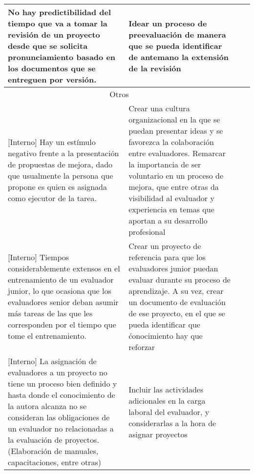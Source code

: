 \documentclass{article}
\begin{document}
\begin{landscape}
\begin{longtable}{ |p{12cm}|p{8cm}|p{2cm}|p{2cm}|}
No hay predictibilidad del tiempo que va a tomar la revisión de un proyecto desde que se solicita pronunciamiento basado en los documentos que se entreguen por versión. & Idear un proceso de preevaluación de manera que se pueda identificar de antemano la extensión de la revisión & & \\\hline

\multicolumn{2}{|c|}{Otros} & & \\\hline

[Interno] Hay un estímulo negativo frente a la presentación de propuestas de mejora, dado que usualmente la persona que propone es quien es asignada como ejecutor de la tarea. & Crear una cultura organizacional en la que se puedan presentar ideas y se favorezca la colaboración entre evaluadores. Remarcar la importancia de ser voluntario en un proceso de mejora, que entre otras da visibilidad al evaluador y experiencia en temas que aportan a su desarrollo profesional & & \\\hline

[Interno] Tiempos considerablemente extensos en el entrenamiento de un evaluador junior, lo que ocasiona que los evaluadores senior deban asumir más tareas de las que les corresponden por el tiempo que tome el entrenamiento. & Crear un proyecto de referencia para que los evaluadores junior puedan evaluar durante su proceso de aprendizaje. A su vez, crear un documento de evaluación de ese proyecto, en el que se pueda identificar que ćonocimiento hay que reforzar  & & \\\hline

[Interno] La asignación de evaluadores a un proyecto no tiene un proceso bien definido y hasta donde el conocimiento de la autora alcanza no se consideran las obligaciones de un evaluador no relacionadas a la evaluación de proyectos. (Elaboración de manuales, capacitaciones, entre otras) & Incluir las actividades adicionales en la carga laboral del evaluador, y considerarlas a la hora de asignar proyectos & & \\\hline

\end{longtable}



\end{landscape}
\end{document}
